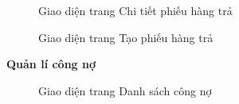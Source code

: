 \begin{figure}[H]
    \begin{center}
        \caption{Giao diện trang Chi tiết phiếu hàng trả}
        \label{result_chi_tiet_hang_tra}
    \end{center}
\end{figure}

\begin{figure}[H]
    \begin{center}
        \caption{Giao diện trang Tạo phiếu hàng trả}
        \label{result_tao_hang_tra}
    \end{center}
\end{figure}

\textbf{Quản lí công nợ}

\begin{figure}[H]
    \begin{center}
        \caption{Giao diện trang Danh sách công nợ}
        \label{result_danh_sach_cong_no}
    \end{center}
\end{figure}

